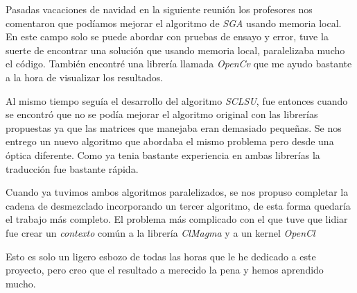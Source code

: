 Pasadas vacaciones de navidad en la siguiente reunión los profesores nos comentaron que podíamos mejorar el algoritmo de \textit{SGA} usando memoria local. En este campo solo se puede abordar con pruebas de ensayo y error, tuve la suerte de encontrar una solución que usando memoria local, paralelizaba mucho el código. También encontré una librería llamada \textit{OpenCv} que me ayudo bastante a la hora de visualizar los resultados.

Al mismo tiempo seguía el desarrollo del algoritmo \textit{SCLSU}, fue entonces cuando se encontró que no se podía mejorar el algoritmo original con las librerías propuestas ya que las matrices que manejaba eran demasiado pequeñas. Se nos entrego un nuevo algoritmo que abordaba el mismo problema pero desde una óptica diferente. Como ya tenia bastante experiencia en ambas librerías la traducción fue bastante rápida.

Cuando ya tuvimos ambos algoritmos paralelizados, se nos propuso completar la cadena de desmezclado incorporando un tercer algoritmo, de esta forma quedaría el trabajo más completo. El problema más complicado con el que tuve que lidiar fue crear un \textit{contexto} común a la librería \textit{ClMagma} y a un kernel \textit{OpenCl}

Esto es solo un ligero esbozo de todas las horas que le he dedicado a este proyecto, pero creo que el resultado a merecido la pena y hemos aprendido mucho.





